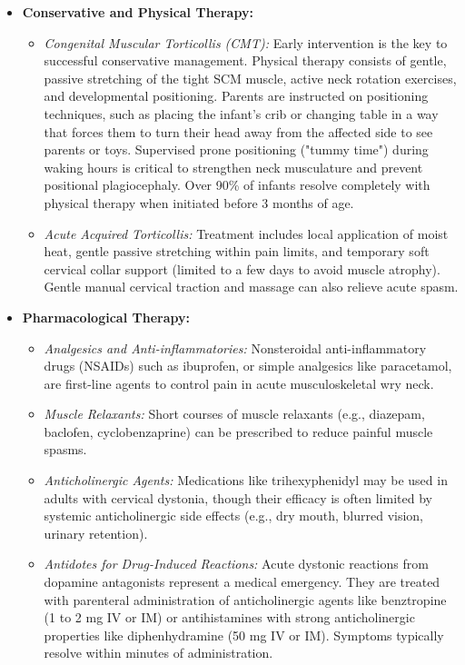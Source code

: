 \begin{itemize}
    \item \textbf{Conservative and Physical Therapy:}
    \begin{itemize}
        \item \textit{Congenital Muscular Torticollis (CMT):} Early intervention is the key to successful conservative management. Physical therapy consists of gentle, passive stretching of the tight SCM muscle, active neck rotation exercises, and developmental positioning. Parents are instructed on positioning techniques, such as placing the infant's crib or changing table in a way that forces them to turn their head away from the affected side to see parents or toys. Supervised prone positioning ("tummy time") during waking hours is critical to strengthen neck musculature and prevent positional plagiocephaly. Over 90\% of infants resolve completely with physical therapy when initiated before 3 months of age.
        \item \textit{Acute Acquired Torticollis:} Treatment includes local application of moist heat, gentle passive stretching within pain limits, and temporary soft cervical collar support (limited to a few days to avoid muscle atrophy). Gentle manual cervical traction and massage can also relieve acute spasm.
    \end{itemize}
    \item \textbf{Pharmacological Therapy:}
    \begin{itemize}
        \item \textit{Analgesics and Anti-inflammatories:} Nonsteroidal anti-inflammatory drugs (NSAIDs) such as ibuprofen, or simple analgesics like paracetamol, are first-line agents to control pain in acute musculoskeletal wry neck.
        \item \textit{Muscle Relaxants:} Short courses of muscle relaxants (e.g., diazepam, baclofen, cyclobenzaprine) can be prescribed to reduce painful muscle spasms.
        \item \textit{Anticholinergic Agents:} Medications like trihexyphenidyl may be used in adults with cervical dystonia, though their efficacy is often limited by systemic anticholinergic side effects (e.g., dry mouth, blurred vision, urinary retention).
        \item \textit{Antidotes for Drug-Induced Reactions:} Acute dystonic reactions from dopamine antagonists represent a medical emergency. They are treated with parenteral administration of anticholinergic agents like benztropine (1 to 2 mg IV or IM) or antihistamines with strong anticholinergic properties like diphenhydramine (50 mg IV or IM). Symptoms typically resolve within minutes of administration.

\end{itemize}
\end{itemize}
